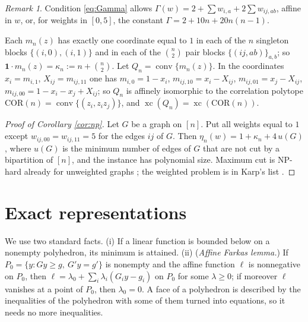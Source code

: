 \documentclass[11pt]{amsart}
\theoremstyle{plain}
\theoremstyle{definition}
\theoremstyle{remark}
\newtheorem{remark}[theorem]{Remark}
\newcommand{\one}{\mathbf{1}}
\newcommand{\COR}{\mathrm{COR}}
\newcommand{\xc}{\operatorname{xc}}
\begin{document}
\begin{remark}\label{rem:const}
Condition \eqref{eq:Gamma} allows $\Gamma(w)=2+\sum w_{i,a}+2\sum w_{ij,ab}$, affine in $w$, or, for weights in
$[0,5]$, the constant $\Gamma=2+10n+20n(n-1)$.
\end{remark}

Each $m_n(z)$ has exactly one coordinate equal to $1$ in each of the $n$ singleton blocks $\{(i,0),(i,1)\}$ and in
each of the $\binom n2$ pair blocks $\{(ij,ab)\}_{a,b}$; so $\one\cdot m_n(z)=\kappa_n:=n+\binom n2$. Let
$Q_n=\operatorname{conv}\{m_n(z)\}$. In the coordinates $x_i=m_{i,1}$, $X_{ij}=m_{ij,11}$ one has
$m_{i,0}=1-x_i$, $m_{ij,10}=x_i-X_{ij}$, $m_{ij,01}=x_j-X_{ij}$, $m_{ij,00}=1-x_i-x_j+X_{ij}$; so $Q_n$ is affinely
isomorphic to the correlation polytope $\COR(n)=\operatorname{conv}\{(z_i,z_iz_j)\}$, and $\xc(Q_n)=\xc(\COR(n))$.

\begin{proof}[Proof of Corollary \ref{cor:np}]
Let $G$ be a graph on $[n]$. Put all weights equal to $1$ except $w_{ij,00}=w_{ij,11}=5$ for the edges $ij$ of $G$.
Then $\eta_n(w)=1+\kappa_n+4\,u(G)$, where $u(G)$ is the minimum number of edges of $G$ that are not cut by a
bipartition of $[n]$, and the instance has polynomial size. Maximum cut is NP-hard already for unweighted graphs \cite{GJS}; the
weighted problem is in Karp's list \cite{Karp}.
\end{proof}

\section{Exact representations}\label{sec:exact}

We use two standard facts. (i) If a linear function is bounded below on a nonempty polyhedron, its minimum is
attained. (ii) (\emph{Affine Farkas lemma.}) If $P_0=\{y:Gy\ge g,\ G'y=g'\}$ is nonempty and the affine function
$\ell$ is nonnegative on $P_0$, then $\ell=\lambda_0+\sum_i\lambda_i(G_iy-g_i)$ on $P_0$ for some $\lambda\ge0$; if
moreover $\ell$ vanishes at a point of $P_0$, then $\lambda_0=0$. A face of a polyhedron is described by the
inequalities of the polyhedron with some of them turned into equations, so it needs no more inequalities.
\end{document}
